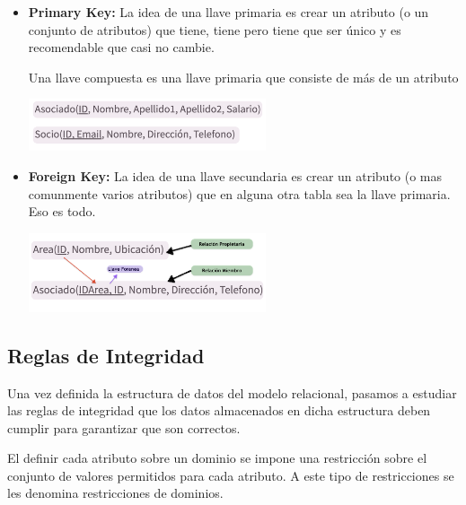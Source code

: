 \documentclass[12pt, fleqn]{report}                             %
\theoremstyle{break}                                            %
\begin{document}
                \begin{itemize}
                    \item
                        \textbf{Primary Key:}
                        La idea de una llave primaria es crear un atributo (o un conjunto de 
                        atributos) que tiene, tiene pero tiene que ser único y es recomendable
                        que casi no cambie.

                        Una llave compuesta es una llave primaria que consiste de más de un atributo

                        \includegraphics[width=0.55\textwidth]{LlavesPrimarias}

                    \item
                        \textbf{Foreign Key:}
                        La idea de una llave secundaria es crear un atributo (o mas comunmente
                        varios atributos) que en alguna otra tabla sea la llave primaria. Eso es todo.

                        \includegraphics[width=0.55\textwidth]{LlaveForanea}

                \end{itemize}


            \clearpage
            \subsection{Reglas de Integridad}

                Una vez definida la estructura de datos del modelo relacional, pasamos a estudiar
                las reglas de integridad que los datos almacenados en dicha estructura deben
                cumplir para garantizar que son correctos.

                El definir cada atributo sobre un dominio se impone una restricción sobre el
                conjunto de valores permitidos para cada atributo. A este tipo de restricciones
                se les denomina restricciones de dominios.
\end{document}
